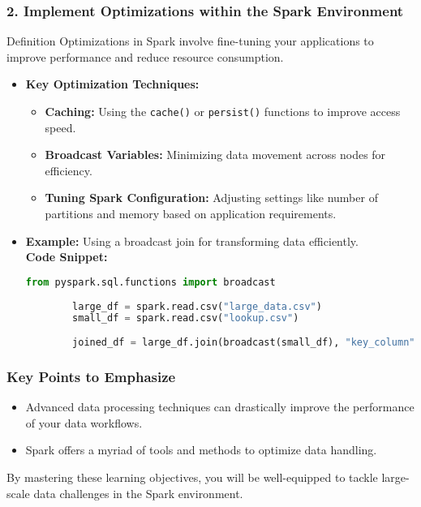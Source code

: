 \documentclass[aspectratio=169]{beamer}
\begin{document}
\begin{frame}[fragile]
    \frametitle{2. Implement Optimizations within the Spark Environment}

    \begin{block}{Definition}
        Optimizations in Spark involve fine-tuning your applications to improve performance and reduce resource consumption.
    \end{block}
    
    \begin{itemize}
        \item \textbf{Key Optimization Techniques:}
        \begin{itemize}
            \item \textbf{Caching:} Using the \texttt{cache()} or \texttt{persist()} functions to improve access speed.
            \item \textbf{Broadcast Variables:} Minimizing data movement across nodes for efficiency.
            \item \textbf{Tuning Spark Configuration:} Adjusting settings like number of partitions and memory based on application requirements.
        \end{itemize}
        \item \textbf{Example:} Using a broadcast join for transforming data efficiently. \\
        \textbf{Code Snippet:}
        \begin{lstlisting}[language=Python]
        from pyspark.sql.functions import broadcast
        
        large_df = spark.read.csv("large_data.csv")
        small_df = spark.read.csv("lookup.csv")
        
        joined_df = large_df.join(broadcast(small_df), "key_column")
        \end{lstlisting}
    \end{itemize}
\end{frame}

\begin{frame}[fragile]
    \frametitle{Key Points to Emphasize}
    \begin{itemize}
        \item Advanced data processing techniques can drastically improve the performance of your data workflows.
        \item Spark offers a myriad of tools and methods to optimize data handling.
    \end{itemize}
    
    By mastering these learning objectives, you will be well-equipped to tackle large-scale data challenges in the Spark environment.
\end{frame}
\end{document}
